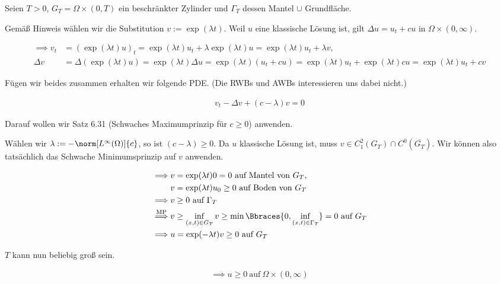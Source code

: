 \begin{solution}

Seien $T > 0$, $G_T = \Omega \times (0, T)$ ein beschränkter Zylinder und $\Gamma_T$ dessen Mantel $\cup$ Grundfläche.

Gemäß Hinweis wählen wir die Substitution $v := \exp(\lambda t)$.
Weil $u$ eine klassische Lösung ist, gilt $\Delta u = u_t + c u$ in $\Omega \times (0, \infty)$.

\begin{align*}
  \implies
  v_t
  & =
  (\exp(\lambda t) u)_t
  =
  \exp (\lambda t) u_t
  +
  \lambda \exp(\lambda t) u
  =
  \exp (\lambda t) u_t + \lambda v, \\
  \Delta v
  & =
  \Delta (\exp(\lambda t) u)
  =
  \exp(\lambda t) \Delta u
  =
  \exp(\lambda t) (u_t + c u)
  =
  \exp(\lambda t) u_t + \exp(\lambda t) c u
  =
  \exp(\lambda t) u_t + c v
\end{align*}

Fügen wir beides zusammen erhalten wir folgende PDE.
(Die RWBs und AWBs interessieren uns dabei nicht.)

\begin{align*}
  v_t - \Delta v + (c - \lambda) v = 0
\end{align*}

Darauf wollen wir Satz 6.31 (Schwaches Maximumprinzip für $c \geq 0$) anwenden.


Wählen wir $\lambda := - \norm[L^\infty(\Omega)]{c}$, so ist $(c - \lambda) \geq 0$.
Da $u$ klassische Lösung ist, muss $v \in C_{1}^{2}(G_T) \cap C^0(\overline{G_T})$.
Wir können also tatsächlich das Schwache Minimumsprinzip auf $v$ anwenden.

\begin{align*}
  \implies
  & v = \exp(\lambda t) 0 = 0 ~\text{auf Mantel von}~ G_T, \\
  & v = \exp(\lambda t) u_0 \geq 0 ~\text{auf Boden von}~ G_T \\
  \implies
  & v \geq 0 ~\text{auf}~ \Gamma_T \\
  \stackrel{\mathrm{MP}}{\implies}
  & v \geq \inf_{(x, t) \in G_T} v \geq \min \Bbraces{0, \inf_{(x, t) \in \Gamma_T}} = 0 ~\text{auf}~ G_T \\
  \implies
  & u = \exp(-\lambda t) v \geq 0 ~\text{auf}~ G_T
\end{align*}

$T$ kann nun beliebig groß sein.

\begin{align*}
  \implies u \geq 0 ~\text{auf}~ \Omega \times (0, \infty)
\end{align*}

\end{solution}

